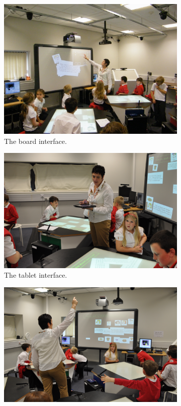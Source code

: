 \documentclass[manuscript, review, screen]{acmart}
\begin{document}
\begin{figure}[t]
	\centering
	\begin{subfigure}[t]{0.3\textwidth}
		\centering
		\includegraphics[width=\textwidth]{figures/study_board.png}
		\caption{The board interface.}
		\label{fig:studyBoard}
	\end{subfigure}
	\begin{subfigure}[t]{0.3\textwidth}
		\centering
		\includegraphics[width=\textwidth]{figures/study_tablet.png}
		\caption{The tablet interface.}
		\label{fig:studyTablet}
	\end{subfigure}
	\begin{subfigure}[t]{0.3\textwidth}
		\centering
		\includegraphics[width=\textwidth]{figures/study_kinect.png}

\end{subfigure}
\end{figure}
\end{document}
